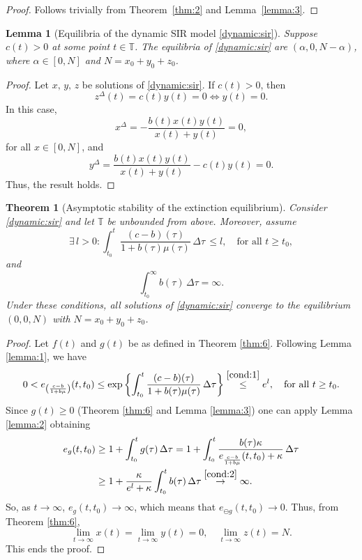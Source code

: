 \documentclass[pdflatex,sn-mathphys-num]{sn-jnl}
\newtheorem{theorem}{Theorem}
\newtheorem{lemma}{Lemma}
\theoremstyle{remark}
\begin{document}
\begin{proof}
Follows trivially from Theorem~\ref{thm:2} and Lemma~\ref{lemma:3}.
\end{proof}

\begin{lemma}[Equilibria of the dynamic SIR model \eqref{dynamic:sir}]
\label{lemma:4}
Suppose $c(t) > 0$ at some point $t \in \mathbb{T}$. The equilibria of 
\eqref{dynamic:sir} are $(\alpha, 0, N-\alpha)$, where $\alpha \in [0,N]$ 
and $N = x_0 + y_0 + z_0$. 
\end{lemma}

\begin{proof}
Let $x,\,y,\,z$ be solutions of \eqref{dynamic:sir}. If $c(t) > 0$, then
$$
z^\Delta(t) = c(t)y(t) = 0 \Leftrightarrow y(t) = 0. 
$$
In this case, 
$$
x^\Delta = -\frac{b(t)x(t)y(t)}{x(t) + y(t)} = 0, 
$$
for all $x \in [0,N]$, and 
$$
y^\Delta = \frac{b(t)x(t)y(t)}{x(t) + y(t)} - c(t)y(t) = 0.
$$
Thus, the result holds. 
\end{proof}

\begin{theorem}[Asymptotic stability of the extinction equilibrium]
\label{thm:7}
Consider \eqref{dynamic:sir} and let $\mathbb{T}$ be unbounded from above.
Moreover, assume
\begin{equation}
\label{cond:1}
\exists \, l > 0 : \int_{t_0}^t \frac{(c-b)(\tau)}{1 + b(\tau)\mu(\tau)}\, \Delta\tau\, 
\leq l, \quad \text{for all}\,\, t \geq t_0,
\end{equation}
and 
\begin{equation}
\label{cond:2}
\int_{t_0}^\infty b(\tau)\, \Delta\tau = \infty.
\end{equation}
Under these conditions, all solutions of \eqref{dynamic:sir} converge to the 
equilibrium $(0,0,N)$ with $N = x_0 + y_0 + z_0$.
\end{theorem}

\begin{proof}
Let $f(t)$ and $g(t)$ be as defined in Theorem \ref{thm:6}. Following 
Lemma \ref{lemma:1}, we have
$$
0 < e_{\left(\frac{c-b}{1+b\mu}\right)}(t,t_0) 
\leq \exp\left\{\int_{t_0}^t \frac{(c-b)(\tau)}{1+b(\tau)\mu(\tau)}\,\Delta\tau\right\}
\displaystyle \overset{\eqref{cond:1}}{\leq} e^l, \quad \text{for all}\,\,t \geq t_0. 
$$
Since $g(t) \geq 0$ (Theorem \ref{thm:6} and Lemma \ref{lemma:3}) one can apply
Lemma \ref{lemma:2} obtaining
\begin{equation*}
\begin{aligned}
e_g(t,t_0) &\geq 1 + \int_{t_0}^t g(\tau)\,\Delta\tau = 1 
+ \int_{t_0}^t \frac{b(\tau)\kappa}{e_{\frac{c-b}{1+b\mu}}(t,t_0) + \kappa}\, \Delta\tau\\
& \geq 1 + \frac{\kappa}{e^l + \kappa}\int_{t_0}^t b(\tau)\,\Delta\tau
\overset{\eqref{cond:2}}{\rightarrow} \infty.
\end{aligned}
\end{equation*}
So, as $t \rightarrow \infty$, $e_g(t,t_0) \rightarrow \infty$, which means that 
$e_{\ominus g}(t,t_0) \rightarrow 0$. Thus, from Theorem \ref{thm:6},
$$
\lim_ {t \rightarrow \infty} x(t) = \lim_ {t \rightarrow \infty} y(t) = 0,
\quad \lim_ {t \rightarrow \infty} z(t) = N.
$$
This ends the proof.
\end{proof}
\end{document}
